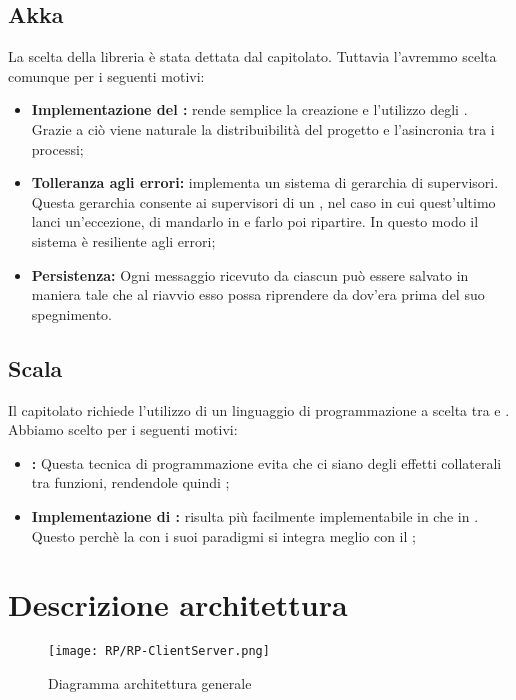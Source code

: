 \documentclass{scalatekids-article}
\begin{document}
\subsection{Akka}
La scelta della libreria  è stata dettata dal capitolato. Tuttavia l'avremmo scelta comunque per i seguenti motivi:
\begin{itemize}
\item\textbf{Implementazione del :}  rende semplice la creazione e l'utilizzo degli . Grazie a ciò viene naturale la distribuibilità del progetto e l'asincronia tra i processi;
\item\textbf{Tolleranza agli errori:}  implementa un sistema di gerarchia di supervisori. Questa gerarchia consente ai supervisori di un , nel caso in cui quest'ultimo lanci un'eccezione, di mandarlo in  e farlo poi ripartire. In questo modo il sistema è resiliente agli errori;
\item\textbf{Persistenza:} Ogni messaggio ricevuto da ciascun  può essere salvato in maniera tale che al riavvio esso possa riprendere da dov'era prima del suo spegnimento.
\end{itemize}
\subsection{Scala}
Il capitolato richiede l'utilizzo di un linguaggio di programmazione a scelta tra  e . Abbiamo scelto  per i seguenti motivi:
\begin{itemize}
\item\textbf{:} Questa tecnica di programmazione evita che ci siano degli effetti collaterali tra funzioni, rendendole quindi ;
\item\textbf{Implementazione di :}  risulta più facilmente implementabile in  che in . Questo perchè la  con i suoi paradigmi si integra meglio con il ;%
\end{itemize}

\section{Descrizione architettura}

\begin{figure}[H]
  \begin{center}
    \texttt{[image: RP/RP-ClientServer.png]}
    \caption*{Diagramma architettura generale}
  \end{center}
\end{figure}
\end{document}

